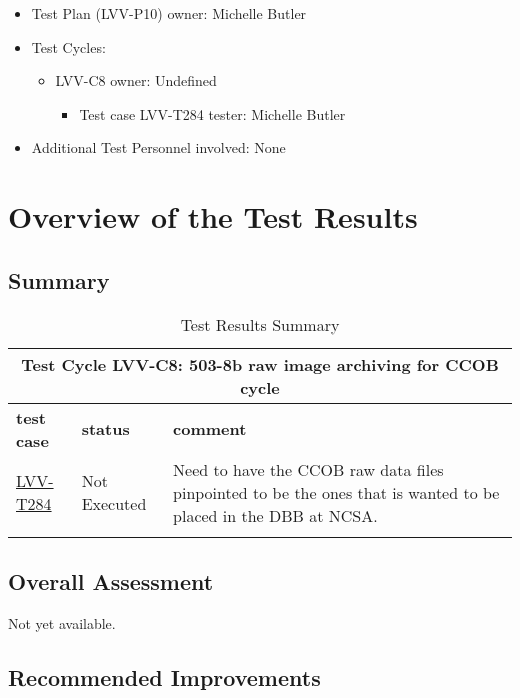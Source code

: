 \documentclass[DM,lsstdraft,STR,toc]{lsstdoc}
\begin{document}
\begin{itemize}
\item Test Plan (LVV-P10) owner: Michelle Butler
\item Test Cycles:
\begin{itemize}
  \item LVV-C8 owner: 
    Undefined
  \begin{itemize}
    \item Test case LVV-T284 tester: Michelle Butler
  \end{itemize}
\end{itemize}
\item Additional Test Personnel involved: None
\end{itemize}

\newpage

\section{Overview of the Test Results}
\label{sect:overview}

\subsection{Summary}
\label{sect:summarytable}

\begin{longtable} {p{}p{}p{}}
\toprule
  \multicolumn{3}{c}{ Test Cycle {\bf LVV-C8: 503-8b raw image archiving for CCOB cycle }} \\\hline
  {\bf \footnotesize test case} & {\bf \footnotesize status} & {\bf \footnotesize comment} \\\toprule
    \href{https://jira.lsstcorp.org/secure/Tests.jspa#/testCase/LVV-T284}{LVV-T284} 
    & Not Executed & Need to have the CCOB raw data files pinpointed to be the ones that is
wanted to be placed in the DBB at NCSA.~~

    \\\hline

\caption{Test Results Summary}
\label{table:summary}
\end{longtable}

\subsection{Overall Assessment}
\label{sect:overallassessment}

Not yet available.

\subsection{Recommended Improvements}
\label{sect:recommendations}
\end{document}
